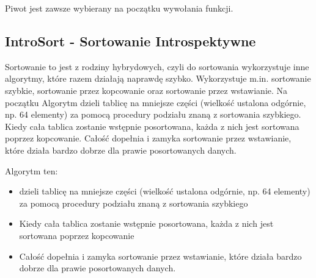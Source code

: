 \documentclass[12pt,a4paper,oneside]{article}
\begin{document}
Piwot jest zawsze wybierany na początku wywołania funkcji.

\subsection{IntroSort - Sortowanie Introspektywne}
Sortowanie to jest z rodziny hybrydowych, czyli do sortowania wykorzystuje inne algorytmy, które razem działają naprawdę szybko. Wykorzystuje m.in. sortowanie szybkie, sortowanie przez kopcowanie oraz sortowanie przez wstawianie. 
Na początku Algorytm dzieli tablicę na mniejsze części (wielkość ustalona odgórnie, np. 64 elementy) za pomocą procedury podziału znaną z sortowania szybkiego. Kiedy cała tablica zostanie  wstępnie posortowana, każda z nich jest sortowana poprzez kopcowanie. Całość dopełnia i zamyka sortowanie przez wstawianie, które działa bardzo dobrze dla prawie posortowanych danych.

Algorytm ten:
\begin{itemize}
	\item dzieli tablicę na mniejsze części (wielkość ustalona odgórnie, np. 64 elementy) za pomocą procedury podziału znaną z sortowania szybkiego
	\item Kiedy cała tablica zostanie wstępnie posortowana, każda z nich jest sortowana poprzez kopcowanie
	\item Całość dopełnia i zamyka sortowanie przez wstawianie, które działa bardzo dobrze dla prawie posortowanych danych.
\end{itemize}
\end{document}
